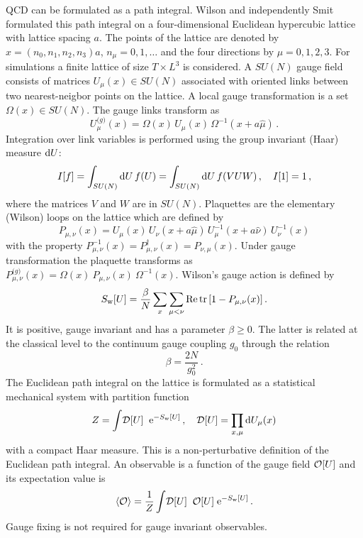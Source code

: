 \documentclass{PoS}
\newcommand{\tr}{\mathrm{tr}\,}
\newcommand{\SU}[1]{SU(#1)}
\newcommand{\gauge} [3][U]{\ensuremath{#1_{#2}(#3)}}
\newcommand{\plaq} [4][P]{\ensuremath{#1_{#2,#3}(#4)}}
\newcommand{\Sw}{S_{\rm w}}
\newcommand{\rD}[1]{{\mathcal D}[#1]}
\begin{document}
QCD can be formulated as a path integral. Wilson \cite{Wilson:1974sk} and
independently Smit \cite{Wilson:2004de}
formulated this path integral on a four-dimensional Euclidean hypercubic 
lattice with lattice spacing $a$. The points of the lattice are denoted by
$x=(n_0,n_1,n_2,n_3)a$, $n_\mu=0,1,\ldots$ and the four directions by 
$\mu=0,1,2,3$.
For simulations a finite lattice of size $T\times L^3$ is considered.
A $\SU{N}$ gauge field consists of matrices $\gauge{\mu}{x}\in\SU{N}$
associated with oriented links between two nearest-neigbor points on
the lattice. A local gauge transformation is a set $\Omega(x)\in\SU{N}$.
The gauge links transform as
\begin{equation}\label{e:link_gtrsf}
\gauge[U^{\mathrm (g)}]{\mu}{x} = \Omega(x)\,\gauge{\mu}{x}\,\Omega^{-1}(x+a\hat{\mu}) \,.
\end{equation}
Integration over link variables is performed using the
group invariant (Haar) measure ${\rm d}U$:
\begin{equation}\label{e:Haar}
I[f] = \int_{\SU{N}}{\rm d}U\,f(U) = \int_{\SU{N}}{\rm d}U\,f(VUW)\,,\quad I[1]=1 \,,
\end{equation}
where the matrices $V$ and $W$ are in $\SU{N}$.
Plaquettes are the elementary (Wilson) loops on the lattice which are defined by
\begin{equation}\label{e:plaq}
\plaq{\mu}{\nu}{x} = 
 \gauge{\mu}{x}\,\gauge{\nu}{x+a\hat{\mu}}\,\gauge[U^{-1}]{\mu}{x+a\hat{\nu}}\,\gauge[U^{-1}]{\nu}{x}
\end{equation}
with the property $\plaq[P^{-1}]{\mu}{\nu}{x} = \plaq[P^{\dagger}]{\mu}{\nu}{x} = \plaq{\nu}{\mu}{x}$. Under gauge transformation the plaquette transforms as
$\plaq[P^{\mathrm (g)}]{\mu}{\nu}{x}=\Omega(x)~\plaq{\mu}{\nu}{x}~\Omega^{-1}(x)$.
Wilson's gauge action is defined by
\begin{equation}\label{e:Swgauge}
\Sw[U] = \frac{\beta}{N} \sum_{x}\sum_{\mu<\nu} 
 {\rm Re}\,\tr[1 - \plaq{\mu}{\nu}{x}] \,.
\end{equation}
It is positive, gauge invariant and has a parameter $\beta\ge0$.
The latter is related at the classical level to the continuum gauge
coupling $g_0$ through the relation
\begin{equation}\label{e:betapar}
 \beta = \frac{2N}{g_0^2} \,.
\end{equation}
The Euclidean path integral on the lattice is formulated as a statistical
mechanical system with partition function
\begin{equation}\label{e:Zgauge}
Z = \int\! \rD{U} \;\; {\rm e}^{-\Sw[U]}\,,\quad
\rD{U}=\prod_{x,\mu} {\rm d}\gauge{\mu}{x}
\end{equation}
with a compact Haar measure. This is a non-perturbative definition of the
Euclidean path integral.
An observable is a function of the gauge field ${\cal O}[U]$ and its
expectation value is
\begin{equation}\label{e:evalue}
\langle {\cal O} \rangle = \frac{1}{Z}
\int\! \rD{U} \;\; {\cal O}[U] \; {\rm e}^{-\Sw[U]} \,.
\end{equation}
Gauge fixing is not required for gauge invariant observables.
\end{document}
